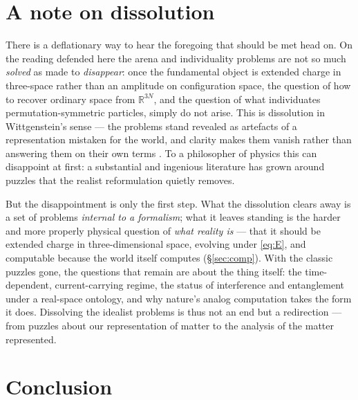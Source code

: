 \documentclass[11pt]{article}
\begin{document}
\section{A note on dissolution}
\label{sec:wittgenstein}

There is a deflationary way to hear the foregoing that should be met head on. On the reading defended here
the arena and individuality problems are not so much \emph{solved} as made to \emph{disappear}: once the
fundamental object is extended charge in three-space rather than an amplitude on configuration space, the
question of how to recover ordinary space from $\mathbb R^{3N}$, and the question of what individuates
permutation-symmetric particles, simply do not arise. This is dissolution in Wittgenstein's sense --- the
problems stand revealed as artefacts of a representation mistaken for the world, and clarity makes them
vanish rather than answering them on their own terms \cite{Wittgenstein1921,Wittgenstein1953}. To a
philosopher of physics this can disappoint at first: a substantial and ingenious literature has grown around
puzzles that the realist reformulation quietly removes.

But the disappointment is only the first step. What the dissolution clears away is a set of problems
\emph{internal to a formalism}; what it leaves standing is the harder and more properly physical question of
\emph{what reality is} --- that it should be extended charge in three-dimensional space, evolving under
\eqref{eq:E}, and computable because the world itself computes (\S\ref{sec:comp}). With the classic puzzles
gone, the questions that remain are about the thing itself: the time-dependent, current-carrying regime, the
status of interference and entanglement under a real-space ontology, and why nature's analog computation
takes the form it does. Dissolving the idealist problems is thus not an end but a redirection --- from
puzzles about our representation of matter to the analysis of the matter represented.

\section{Conclusion}
\label{sec:concl}
\end{document}
